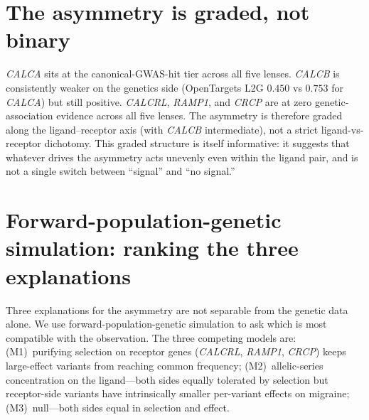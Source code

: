 \documentclass[11pt]{article}
\begin{document}
\section{The asymmetry is graded, not binary}

\textit{CALCA} sits at the canonical-GWAS-hit tier across all five lenses. \textit{CALCB} is consistently weaker on the genetics side (OpenTargets L2G $0.450$ vs $0.753$ for \textit{CALCA}) but still positive. \textit{CALCRL}, \textit{RAMP1}, and \textit{CRCP} are at zero genetic-association evidence across all five lenses. The asymmetry is therefore graded along the ligand--receptor axis (with \textit{CALCB} intermediate), not a strict ligand-vs-receptor dichotomy. This graded structure is itself informative: it suggests that whatever drives the asymmetry acts unevenly even within the ligand pair, and is not a single switch between ``signal'' and ``no signal.''

\section{Forward-population-genetic simulation: ranking the three explanations}
\label{sec:sim}

Three explanations for the asymmetry are not separable from the genetic data alone. We use forward-population-genetic simulation to ask which is most compatible with the observation. The three competing models are: (M1)~purifying selection on receptor genes (\textit{CALCRL}, \textit{RAMP1}, \textit{CRCP}) keeps large-effect variants from reaching common frequency; (M2)~allelic-series concentration on the ligand---both sides equally tolerated by selection but receptor-side variants have intrinsically smaller per-variant effects on migraine; (M3)~null---both sides equal in selection and effect.
\end{document}
